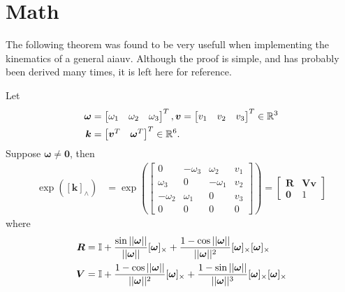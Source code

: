 \chapter{Math}

The following theorem was found to be very usefull when implementing the kinematics
of a general \gls{aiauv}. Although the proof is simple, and has probably been
derived many times, it is left here for reference.
\begin{theorem}
Let
\begin{subequations}
\begin{align*}
\bm{\omega} &= \begin{bmatrix}\omega_1 & \omega_2 & \omega_3 \end{bmatrix}^T,
\bm{v} = \begin{bmatrix}v_1 & v_2 & v_3 \end{bmatrix}^T \in \mathbb{R}^3 \\
\bm{k} &= \begin{bmatrix}\bm{v}^T & \bm{\omega}^T\end{bmatrix}^T \in \mathbb{R}^6.
\end{align*}
\end{subequations}
Suppose \(\bm{\omega} \neq \bm{0}\), then
\begin{subequations}
\label{eq:app:math:proof1}
\begin{align}
    \exp{\left([\bm{k}]_{\wedge}\right)} &= 
    \exp{\left(\begin{bmatrix}
        0 & -\omega_3 & \omega_2 & v_1 \\
        \omega_3 & 0 & -\omega_1 & v_2 \\
        -\omega_2 & \omega_1 & 0 & v_3 \\
        0 & 0 & 0 & 0
    \end{bmatrix} \right)} = \begin{bmatrix}
        \bm{R} & \bm{V}\bm{v} \\
        \bm{0} & 1
    \end{bmatrix}
\end{align}
\end{subequations}
where
\begin{subequations}
\begin{align*}
    \bm{R} &= \mathbb{I}
    + \frac{\sin{||\bm{\omega}||}}{||\bm{\omega}||}[\bm{\omega}]_{\times}
    + \frac{1-\cos{||\bm{\omega}||}}{||\bm{\omega}||^2}
       [\bm{\omega}]_{\times}[\bm{\omega}]_{\times} \\
    \bm{V} &= \mathbb{I}
    + \frac{1-\cos||\bm{\omega}||}{||\bm{\omega}||^2}[\bm{\omega}]_{\times}
    + \frac{1-\sin||\bm{\omega}||}{||\bm{\omega}||^3}[\bm{\omega}]_{\times}[\bm{\omega}]_{\times}
\end{align*}
\end{subequations}
\end{theorem}

